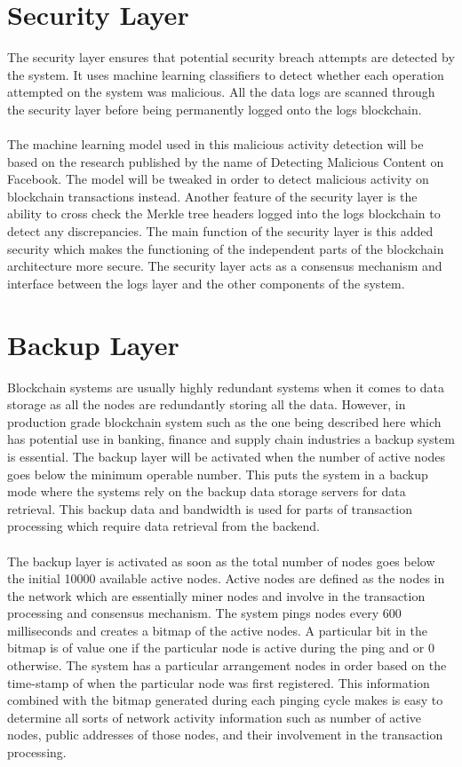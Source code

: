 \documentclass[a4paper,twoside,phd]{BYUPhys}
\begin{document}
\section{Security Layer}
 The security layer ensures that potential security breach attempts are detected by the system. It uses machine learning classifiers to detect whether each operation attempted on the system was malicious. All the data logs are scanned through the security layer before being permanently logged onto the logs blockchain.   
\\
\\
The machine learning model used in this malicious activity detection will be based on the research published by the name of Detecting Malicious Content on Facebook. The model will be tweaked in order to detect malicious activity on blockchain transactions instead. Another feature of the security layer is the ability to cross check the Merkle tree headers logged into the logs blockchain to detect any discrepancies. The main function of the security layer is this added security which makes the functioning of the independent parts of the blockchain architecture more secure. The security layer acts as a consensus mechanism and interface between the logs layer and the other components of the system.
\section{Backup Layer}
Blockchain systems are usually highly redundant systems when it comes to data storage as all the nodes are redundantly storing all the data. However, in production grade blockchain system such as the one being described here which has potential use in banking, finance and supply chain industries a backup system is essential. The backup layer will be activated when the number of active nodes goes below the minimum operable number. This puts the system in a backup mode where the systems rely on the backup data storage servers for data retrieval. This backup data and bandwidth is used for parts of transaction processing which require data retrieval from the backend. 
\\
\\
The backup layer is activated as soon as the total number of nodes goes below the initial 10000 available active nodes. Active nodes are defined as the nodes in the network which are essentially miner nodes and involve in the transaction processing and consensus mechanism. The system pings nodes every 600 milliseconds and creates a bitmap of the active nodes. A particular bit in the bitmap is of value one if the particular node is active during the ping and or 0 otherwise. The system has a particular arrangement nodes in order based on the time-stamp of when the particular node was first registered. This information combined with the bitmap generated during each pinging cycle makes is easy to determine all sorts of network activity information such as number of active nodes, public addresses of those nodes, and their involvement in the transaction processing.
\end{document}
